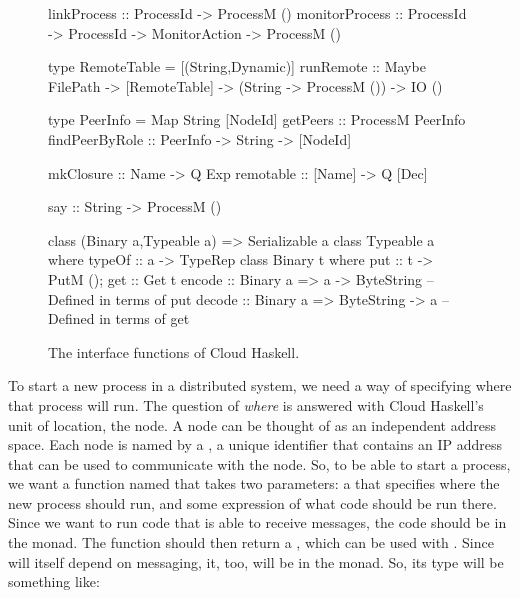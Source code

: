 \documentclass{sigplanconf}
\begin{document}
\begin{figure}[t!]
\begin{code}
linkProcess :: ProcessId -> ProcessM ()
monitorProcess :: ProcessId -> ProcessId 
               -> MonitorAction -> ProcessM ()
\end{code}

\begin{code}
type RemoteTable = [(String,Dynamic)]
runRemote      :: Maybe FilePath -> [RemoteTable] 
               -> (String -> ProcessM ()) -> IO ()

type PeerInfo = Map String [NodeId]
getPeers       :: ProcessM PeerInfo
findPeerByRole :: PeerInfo -> String -> [NodeId]
\end{code}

\begin{code}
mkClosure :: Name   -> Q Exp
remotable :: [Name] -> Q [Dec]
\end{code}

\begin{code}
say :: String -> ProcessM ()
\end{code}

\begin{code}
class (Binary a,Typeable a) => Serializable a
class Typeable a where typeOf :: a -> TypeRep
class Binary t where {put :: t -> PutM (); get :: Get t}
encode :: Binary a => a -> ByteString
  -- Defined in terms of put
decode :: Binary a => ByteString -> a
  -- Defined in terms of get
\end{code}
\caption{The interface functions of Cloud Haskell.%
\label{fig:api}}
\end{figure}


To start a new process in a distributed system, we need a way of specifying where that process will run. 
The question of {\em where} is answered with Cloud Haskell's unit of location, the node. 
A node can be thought of as an independent address space.
Each node is named by a , a unique identifier that contains an IP address that can be used to communicate with the node. 
So, to be able to start a process, we want a function named  that takes two parameters: 
a  that specifies where the new process should run, and some expression of what code should be run there. 
Since we want to run code that is able to receive messages, the code should be in the  monad. 
The  function should then return a , which can be used with .  
Since  will itself depend on messaging, it, too, will be in the  monad. 
So, its type will be something like:
\end{document}
